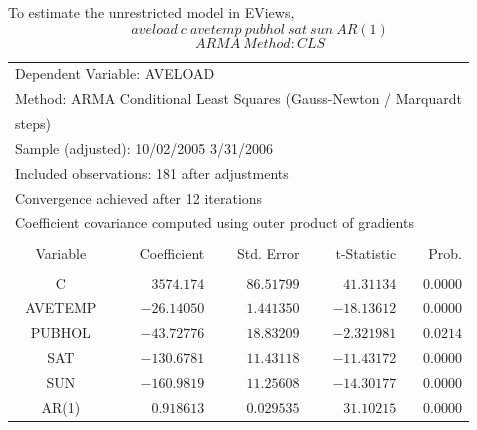 \documentclass[12pt]{report}
\begin{document}
\noindent To estimate the unrestricted model in EViews,
$$aveload\ c\ avetemp\ pubhol\ sat\ sun\ AR(1)$$
$$ARMA\ Method:CLS$$
\begin{table}[!htbp]
	\centering
	\begin{tabular}{lrrrr}
		\multicolumn{3}{l}{Dependent Variable: AVELOAD}&\multicolumn{1}{c}{}&\multicolumn{1}{c}{}\\
		\multicolumn{5}{l}{Method: ARMA Conditional Least Squares (Gauss-Newton / Marquardt}\\
		\multicolumn{2}{l}{steps)}&\multicolumn{1}{c}{}&\multicolumn{1}{c}{}&\multicolumn{1}{c}{}\\
		\multicolumn{4}{l}{Sample (adjusted): 10/02/2005 3/31/2006}&\multicolumn{1}{c}{}\\
		\multicolumn{5}{l}{Included observations: 181 after adjustments}\\
		\multicolumn{5}{l}{Convergence achieved after 12 iterations}\\
		\multicolumn{5}{l}{Coefficient covariance computed using outer product of gradients}\\
		[4.5pt] \hline \\ [-4.5pt]
		\multicolumn{1}{c}{Variable}&\multicolumn{1}{r}{Coefficient}&\multicolumn{1}{r}{Std. Error}&\multicolumn{1}{r}{t-Statistic}&\multicolumn{1}{r}{Prob.}\\
		[4.5pt] \hline \\ [-4.5pt]
		\multicolumn{1}{c}{C}&\multicolumn{1}{r}{$3574.174$}&\multicolumn{1}{r}{$86.51799$}&\multicolumn{1}{r}{$41.31134$}&\multicolumn{1}{r}{$0.0000$}\\
		\multicolumn{1}{c}{AVETEMP}&\multicolumn{1}{r}{$-26.14050$}&\multicolumn{1}{r}{$1.441350$}&\multicolumn{1}{r}{$-18.13612$}&\multicolumn{1}{r}{$0.0000$}\\
		\multicolumn{1}{c}{PUBHOL}&\multicolumn{1}{r}{$-43.72776$}&\multicolumn{1}{r}{$18.83209$}&\multicolumn{1}{r}{$-2.321981$}&\multicolumn{1}{r}{$0.0214$}\\
		\multicolumn{1}{c}{SAT}&\multicolumn{1}{r}{$-130.6781$}&\multicolumn{1}{r}{$11.43118$}&\multicolumn{1}{r}{$-11.43172$}&\multicolumn{1}{r}{$0.0000$}\\
		\multicolumn{1}{c}{SUN}&\multicolumn{1}{r}{$-160.9819$}&\multicolumn{1}{r}{$11.25608$}&\multicolumn{1}{r}{$-14.30177$}&\multicolumn{1}{r}{$0.0000$}\\
		\multicolumn{1}{c}{AR(1)}&\multicolumn{1}{r}{$0.918613$}&\multicolumn{1}{r}{$0.029535$}&\multicolumn{1}{r}{$31.10215$}&\multicolumn{1}{r}{$0.0000$}\\

\end{tabular}
\end{table}
\end{document}

